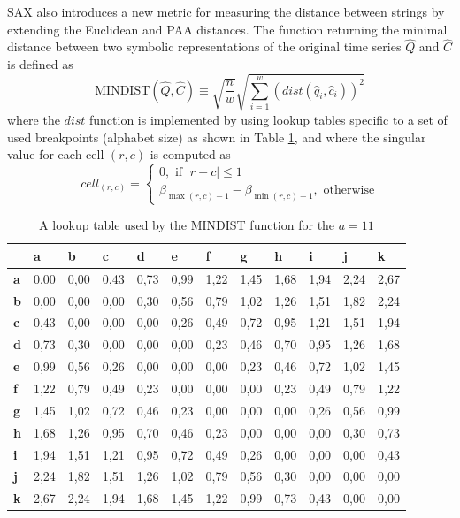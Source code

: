 SAX also introduces a new metric for measuring the distance between strings by extending the Euclidean and PAA \cite{citeulike:2946589} distances. 
The function returning the minimal distance between two symbolic representations of the original time series $\widehat{Q}$ and $\widehat{C}$ 
is defined as
\begin{equation}
\text{MINDIST}(\widehat{Q},\widehat{C}) \equiv \sqrt{ \frac{n}{w} } \sqrt{ \sum_{i=1}^{w} ( dist( \widehat{q}_{i}, \widehat{c}_{i} ) )^{2}}
\label{eq:sax_mindist}
\end{equation} 
where the $dist$ function is implemented by using lookup tables specific to a set of used breakpoints (alphabet size) as shown in 
Table \ref{tbl:sax_lookup}, and where the singular value for each cell $(r,c)$ is computed as 
\begin{equation}
cell_{(r,c)} = 
\begin{cases} 
0, \text{ if }\left| r-c \right| \leq 1 \\
\beta_{\max(r,c) - 1} - \beta_{\min(r,c) - 1}, \text{ otherwise}
\end{cases}
\label{eq:cell}
\end{equation}


\begin{table}
\caption{A lookup table used by the MINDIST function for the $a=11$}
\label{tbl:sax_lookup}
\small
\begin{tabularx}{\textwidth}{|l|X|X|X|X|X|X|X|X|X|X|X|}
\hline
&\textbf{a}&\textbf{b}&\textbf{c}&\textbf{d}&\textbf{e}&\textbf{f}&\textbf{g}&\textbf{h}&\textbf{i}&\textbf{j}&\textbf{k} \\
\hline
\textbf{a}& 0,00 & 0,00 & 0,43 & 0,73 & 0,99 & 1,22 & 1,45 & 1,68 & 1,94 & 2,24 & 2,67 \\
\hline
\textbf{b}& 0,00 & 0,00 & 0,00 & 0,30 & 0,56 & 0,79 & 1,02 & 1,26 & 1,51 & 1,82 & 2,24 \\
\hline
\textbf{c}& 0,43 & 0,00 & 0,00 & 0,00 & 0,26 & 0,49 & 0,72 & 0,95 & 1,21 & 1,51 & 1,94 \\ 
\hline
\textbf{d}& 0,73 & 0,30 & 0,00 & 0,00 & 0,00 & 0,23 & 0,46 & 0,70 & 0,95 & 1,26 & 1,68 \\ 
\hline
\textbf{e}& 0,99 & 0,56 & 0,26 & 0,00 & 0,00 & 0,00 & 0,23 & 0,46 & 0,72 & 1,02 & 1,45 \\ 
\hline
\textbf{f}& 1,22 & 0,79 & 0,49 & 0,23 & 0,00 & 0,00 & 0,00 & 0,23 & 0,49 & 0,79 & 1,22 \\ 
\hline
\textbf{g}& 1,45 & 1,02 & 0,72 & 0,46 & 0,23 & 0,00 & 0,00 & 0,00 & 0,26 & 0,56 & 0,99 \\ 
\hline
\textbf{h}& 1,68 & 1,26 & 0,95 & 0,70 & 0,46 & 0,23 & 0,00 & 0,00 & 0,00 & 0,30 & 0,73 \\ 
\hline
\textbf{i}& 1,94 & 1,51 & 1,21 & 0,95 & 0,72 & 0,49 & 0,26 & 0,00 & 0,00 & 0,00 & 0,43 \\ 
\hline
\textbf{j}& 2,24 & 1,82 & 1,51 & 1,26 & 1,02 & 0,79 & 0,56 & 0,30 & 0,00 & 0,00 & 0,00 \\ 
\hline
\textbf{k}& 2,67 & 2,24 & 1,94 & 1,68 & 1,45 & 1,22 & 0,99 & 0,73 & 0,43 & 0,00 & 0,00 \\ 
\hline
\end{tabularx}
\end{table}

